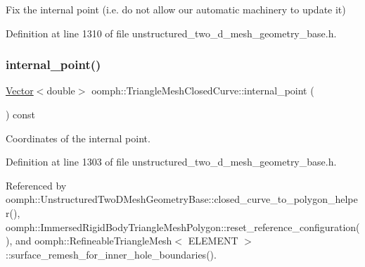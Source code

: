 Fix the internal point (i.\+e. do not allow our automatic machinery to update it) 

Definition at line 1310 of file unstructured\+\_\+two\+\_\+d\+\_\+mesh\+\_\+geometry\+\_\+base.\+h.

\mbox{\label{classoomph_1_1TriangleMeshClosedCurve_a373f3f1227c0824b46b1a3be9e492e35}} 
\subsubsection{\texorpdfstring{internal\+\_\+point()}{internal\_point()}\hspace{0.1cm}{\footnotesize\ttfamily [1/2]}}
{\footnotesize\ttfamily \hyperlink{classoomph_1_1Vector}{Vector}$<$double$>$ oomph\+::\+Triangle\+Mesh\+Closed\+Curve\+::internal\+\_\+point (\begin{DoxyParamCaption}{ }\end{DoxyParamCaption}) const\hspace{0.3cm}{\ttfamily [inline]}}



Coordinates of the internal point. 



Definition at line 1303 of file unstructured\+\_\+two\+\_\+d\+\_\+mesh\+\_\+geometry\+\_\+base.\+h.



Referenced by oomph\+::\+Unstructured\+Two\+D\+Mesh\+Geometry\+Base\+::closed\+\_\+curve\+\_\+to\+\_\+polygon\+\_\+helper(), oomph\+::\+Immersed\+Rigid\+Body\+Triangle\+Mesh\+Polygon\+::reset\+\_\+reference\+\_\+configuration(), and oomph\+::\+Refineable\+Triangle\+Mesh$<$ E\+L\+E\+M\+E\+N\+T $>$\+::surface\+\_\+remesh\+\_\+for\+\_\+inner\+\_\+hole\+\_\+boundaries().

\mbox{\label{classoomph_1_1TriangleMeshClosedCurve_aa1c861decfcfd24df63f14f8ccfcd877}} 
